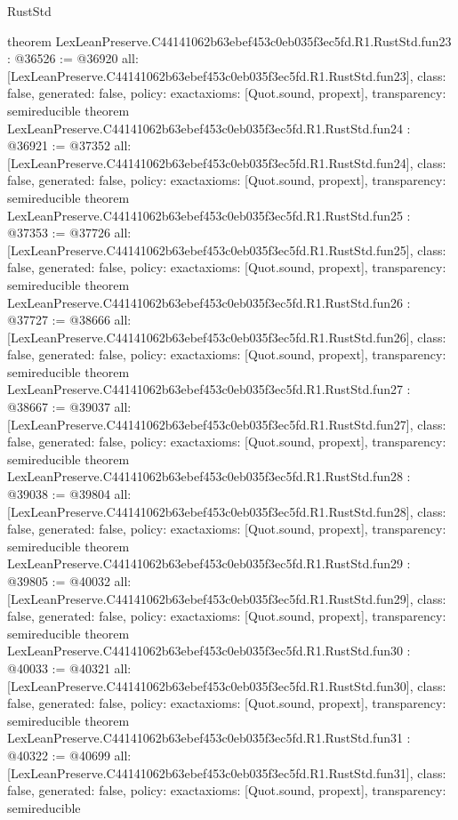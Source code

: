 \begin{lexlean}{RustStd}
\begin{coremodule}
{}
theorem LexLeanPreserve.C44141062b63ebef453c0eb035f3ec5fd.R1.RustStd.fun23 : @36526 := @36920 {
  all: [LexLeanPreserve.C44141062b63ebef453c0eb035f3ec5fd.R1.RustStd.fun23],
  class: false,
  generated: false,
  policy: exact{axioms: [Quot.sound, propext]},
  transparency: semireducible
}
theorem LexLeanPreserve.C44141062b63ebef453c0eb035f3ec5fd.R1.RustStd.fun24 : @36921 := @37352 {
  all: [LexLeanPreserve.C44141062b63ebef453c0eb035f3ec5fd.R1.RustStd.fun24],
  class: false,
  generated: false,
  policy: exact{axioms: [Quot.sound, propext]},
  transparency: semireducible
}
theorem LexLeanPreserve.C44141062b63ebef453c0eb035f3ec5fd.R1.RustStd.fun25 : @37353 := @37726 {
  all: [LexLeanPreserve.C44141062b63ebef453c0eb035f3ec5fd.R1.RustStd.fun25],
  class: false,
  generated: false,
  policy: exact{axioms: [Quot.sound, propext]},
  transparency: semireducible
}
theorem LexLeanPreserve.C44141062b63ebef453c0eb035f3ec5fd.R1.RustStd.fun26 : @37727 := @38666 {
  all: [LexLeanPreserve.C44141062b63ebef453c0eb035f3ec5fd.R1.RustStd.fun26],
  class: false,
  generated: false,
  policy: exact{axioms: [Quot.sound, propext]},
  transparency: semireducible
}
theorem LexLeanPreserve.C44141062b63ebef453c0eb035f3ec5fd.R1.RustStd.fun27 : @38667 := @39037 {
  all: [LexLeanPreserve.C44141062b63ebef453c0eb035f3ec5fd.R1.RustStd.fun27],
  class: false,
  generated: false,
  policy: exact{axioms: [Quot.sound, propext]},
  transparency: semireducible
}
theorem LexLeanPreserve.C44141062b63ebef453c0eb035f3ec5fd.R1.RustStd.fun28 : @39038 := @39804 {
  all: [LexLeanPreserve.C44141062b63ebef453c0eb035f3ec5fd.R1.RustStd.fun28],
  class: false,
  generated: false,
  policy: exact{axioms: [Quot.sound, propext]},
  transparency: semireducible
}
theorem LexLeanPreserve.C44141062b63ebef453c0eb035f3ec5fd.R1.RustStd.fun29 : @39805 := @40032 {
  all: [LexLeanPreserve.C44141062b63ebef453c0eb035f3ec5fd.R1.RustStd.fun29],
  class: false,
  generated: false,
  policy: exact{axioms: [Quot.sound, propext]},
  transparency: semireducible
}
theorem LexLeanPreserve.C44141062b63ebef453c0eb035f3ec5fd.R1.RustStd.fun30 : @40033 := @40321 {
  all: [LexLeanPreserve.C44141062b63ebef453c0eb035f3ec5fd.R1.RustStd.fun30],
  class: false,
  generated: false,
  policy: exact{axioms: [Quot.sound, propext]},
  transparency: semireducible
}
theorem LexLeanPreserve.C44141062b63ebef453c0eb035f3ec5fd.R1.RustStd.fun31 : @40322 := @40699 {
  all: [LexLeanPreserve.C44141062b63ebef453c0eb035f3ec5fd.R1.RustStd.fun31],
  class: false,
  generated: false,
  policy: exact{axioms: [Quot.sound, propext]},
  transparency: semireducible
}
\end{coremodule}
\end{lexlean}
